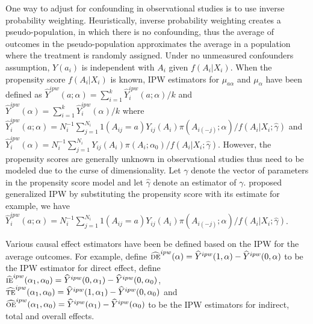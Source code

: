 \documentclass[oupdraft]{bio}
\begin{document}
One way to adjust for confounding in observational studies is to use inverse probability weighting. Heuristically, inverse probability weighting creates a pseudo-population, in which there is no confounding, thus the average of outcomes in the pseudo-population approximates the average in a population where the treatment is randomly assigned. Under no unmeasured confounders assumption, $Y({a_i})$ is independent with $A_i$ given $f(A_i|X_i)$. When the propensity score $f(A_i|X_i)$ is known, IPW estimators for $\mu_{a\alpha}$ and $\mu_{\alpha}$ have been defined as $\widehat{Y}^{ipw}(a;\alpha)= \sum_{i=1}^k\widehat{Y}_i^{ipw}(a;\alpha)/k$ and $\widehat{Y}^{ipw}(\alpha)= \sum_{i=1}^k\widehat{Y}_i^{ipw}(\alpha)/k$ where $\widehat{Y}_i^{ipw}(a;\alpha)= N_i^{-1} \sum_{j=1}^{N_i}1(A_{ij}=a)Y_{ij}(A_{i})\pi(A_{i(-j)};\alpha)/{f}(A_i|X_i;\hat\gamma)$ and $\widehat{Y}_i^{ipw}(\alpha)= N_i^{-1} \sum_{j=1}^{N_i}Y_{ij}(A_{i})\pi(A_i;\alpha_0)/{f}(A_i|X_i;\hat\gamma)$. However, the propensity scores are generally unknown  in observational studies thus need to be modeled due to the curse of dimensionality. Let $\gamma$ denote the vector of parameters in the propensity score model and let $\hat\gamma$ denote an estimator of $\gamma$. \citet{tchetgen2012causal} proposed generalized IPW by substituting the propensity score with its estimate for example, we have $\widehat{Y}_i^{ipw}(a;\alpha)= N_i^{-1} \sum_{j=1}^{N_i}1(A_{ij}=a)Y_{ij}(A_{i})\pi(A_{i(-j)};\alpha)/{f}(A_i|X_i;\hat\gamma)$. 

Various causal effect estimators have been be defined based on the IPW for the average outcomes. For example, define $\widehat{\textsc{de}}^{ipw}(\alpha)=\widehat{Y}^{ipw}(1,\alpha)-\widehat{Y}^{ipw}(0,\alpha)$ to be the IPW estimator for direct effect, define $\widehat{\textsc{ie}}^{ipw}(\alpha_1,\alpha_0)=\widehat{Y}^{ipw}(0,\alpha_1)-\widehat{Y}^{ipw}(0,\alpha_0)$, $\widehat{\textsc{te}}^{ipw}(\alpha_1,\alpha_0)=\widehat{Y}^{ipw}(1,\alpha_1)-\widehat{Y}^{ipw}(0,\alpha_0)$ and $\widehat{\textsc{oe}}^{ipw}(\alpha_1,\alpha_0)=\widehat{Y}^{ipw}(\alpha_1)-\widehat{Y}^{ipw}(\alpha_0)$ to be the IPW estimators for indirect, total and overall effects. 
\end{document}
